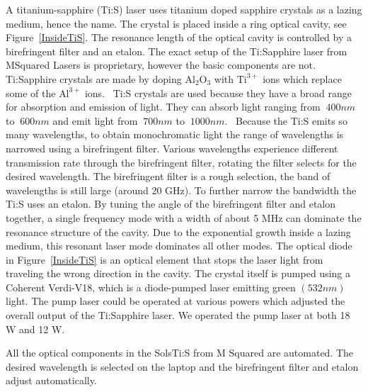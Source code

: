 \documentclass[prb,preprint]{revtex4-1}
\begin{document}
A titanium-sapphire (Ti:S) laser uses titanium doped sapphire crystals as a lazing medium, hence the name. The crystal is placed inside a ring optical cavity, see Figure~\ref{InsideTiS}. The resonance length of the optical cavity is controlled by a birefringent filter and an etalon. The exact setup of the Ti:Sapphire laser from MSquared Lasers is proprietary, however the basic components are not. Ti:Sapphire crystals are made by doping $\text{Al}_2\text{O}_3$ with $\text{Ti}^{3+}$ ions which replace some of the $\text{Al}^{3+}$ ions.~\cite{Ti:S} Ti:S crystals are used because they have a broad range for absorption and emission of light. They can absorb light ranging from $~400 nm$ to $~600 nm$ and emit light from $~700 nm$ to $~1000 nm$.~\cite{Ti:S} Because the Ti:S emits so many wavelengths, to obtain monochromatic light the range of wavelengths is narrowed using a birefringent filter. Various wavelengths experience different transmission rate through the birefringent filter, rotating the filter selects for the desired wavelength. The birefringent filter is a rough selection, the band of wavelengths is still large (around 20 GHz). To further narrow the bandwidth the Ti:S uses an etalon.   By tuning the angle of the birefringent filter and etalon together, a single frequency mode with a width of about 5 MHz can dominate the resonance structure of the cavity.  Due to the exponential growth inside a lazing medium, this resonant laser mode dominates all other modes.  The optical diode in Figure~\ref{InsideTiS} is an optical element that stops the laser light from traveling the wrong direction in the cavity.  The crystal itself is pumped using a Coherent Verdi-V18, which is a diode-pumped laser emitting green $(532nm)$ light. The pump laser could be operated at various powers which adjusted the overall output of the Ti:Sapphire laser. We operated the pump laser at both 18 W and 12 W.

All the optical components in the SolsTi:S from M Squared are automated. The desired wavelength is selected on the laptop and the birefringent filter and etalon adjust automatically.
\end{document}

